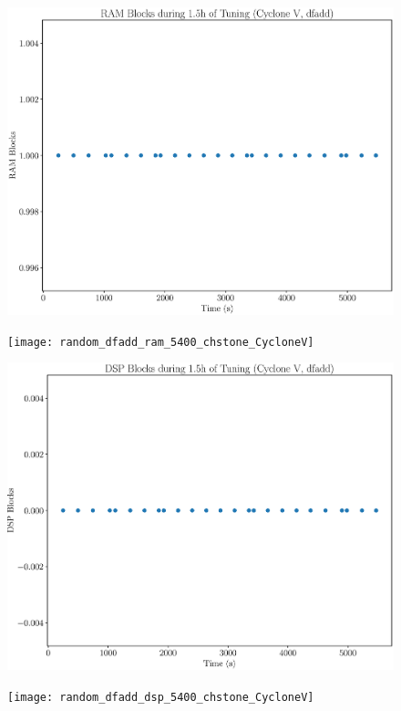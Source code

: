 \documentclass[12pt, a4paper]{article}
\begin{document}
\begin{figure}[htpb]
    \centering
    \noindent
    \begin{minipage}{.48\textwidth}
        \centering
        \includegraphics[scale=.25]{dfadd_ram_5400_chstone_CycloneV}
    \end{minipage}%
    \hfill
    \begin{minipage}{.48\textwidth}
        \centering
        \texttt{[image: random\_dfadd\_ram\_5400\_chstone\_CycloneV]}
    \end{minipage}%

    \begin{minipage}{.48\textwidth}
        \includegraphics[scale=.25]{dfadd_dsp_5400_chstone_CycloneV}
    \end{minipage}%
    \hfill
    \begin{minipage}{.48\textwidth}
        \texttt{[image: random\_dfadd\_dsp\_5400\_chstone\_CycloneV]}
    \end{minipage}%


\end{figure}
\end{document}
